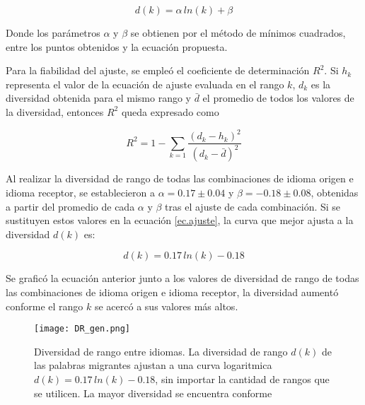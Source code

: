 \begin{equation}
\label{ec.ajuste}
d(k) =  \alpha \, ln(k) + \beta
\end{equation}

Donde los parámetros $\alpha$ y $\beta$  se  obtienen por el método de mínimos cuadrados, entre los puntos obtenidos y la ecuación propuesta.  



Para la fiabilidad del ajuste, se empleó el coeficiente de determinación $R^{2}$. Si $h_{k}$  representa el  valor de la ecuación de ajuste evaluada en el rango $k$,  $d_{k}$ es la diversidad obtenida para el mismo rango y $\bar{d}$ el promedio de todos los valores de la diversidad, entonces $R^{2}$ queda expresado como

\begin{equation}
\label{ec.r2_diversidad}
R^{2} = 1 - \sum_{k = 1} \frac{ \left( d_{k} - h_{k} \right)^{2}  }{ \left( d_{k} - \bar{d} \right)^{2} }	
\end{equation}

Al realizar la diversidad de rango de todas las combinaciones de idioma origen e idioma receptor,  se establecieron a $\alpha = 0.17\pm 0.04$ y $\beta = -0.18 \pm 0.08$, obtenidas a partir del promedio de cada $\alpha$ y $\beta$ tras el ajuste de cada combinación.  Si se sustituyen estos valores en la ecuación \ref{ec.ajuste}, la curva que mejor ajusta a la diversidad $d(k)$ es:


\begin{equation}
\label{ec.gen_ajs}
d(k) = 0.17\,ln(k) - 0.18
\end{equation} 

Se graficó la ecuación anterior junto a los valores de diversidad de rango de todas las combinaciones de idioma origen e idioma receptor, la diversidad aumentó conforme el rango $k$ se acercó a sus valores más altos.



\begin{figure}[h!]
	\centering
	\texttt{[image: DR\_gen.png]}
	\label{fig.DR_gen}
	\caption{Diversidad de rango entre idiomas. La diversidad de rango $d(k)$ de las palabras migrantes ajustan a una curva logaritmica $d(k) = 0.17\,ln(k) - 0.18$, sin importar la cantidad de rangos que se utilicen. La mayor diversidad se encuentra conforme }
\end{figure}


